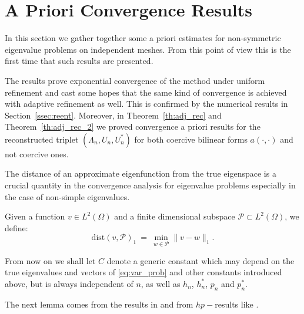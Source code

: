 \documentclass[smallextended]{svjour3}
\begin{document}
\section{A Priori Convergence Results}\label{sse:pcf_priori}\label{sec:aprio}



In this section  we gather together some a priori estimates for non-symmetric eigenvalue
problems on independent meshes. From this point of view this is the first time that such results are presented. 

The results prove exponential convergence of the method under uniform refinement and cast some hopes that the same kind of convergence is achieved with adaptive refinement as well. This is confirmed by the numerical results in Section~\ref{ssec:reent}. 
Moreover, in Theorem~\ref{th:adj_rec} and Theorem~\ref{th:adj_rec_2} we proved convergence a priori results for the reconstructed triplet $(\Lambda_n,U_n,U_n^*)$ for both coercive bilinear forms $a(\cdot,\cdot)$ and not coercive ones.



The distance of an approximate eigenfunction from the true eigenspace
is a crucial quantity in the convergence analysis for
eigenvalue problems  especially in the case of non-simple
eigenvalues.

\begin{definition}
\label{def:dist_h1}
Given a function $v\in L^2(\Omega)$ and a finite dimensional subspace $\mathcal{P}\subset L^2(\Omega)$, we define:
$$
\mathrm{dist}(v,\mathcal{P})_{1}\ =\ \min_{ w\in\mathcal{P}}  \|v-w\|_{1} .
$$

\end{definition}


From now on we shall let $C$ denote  a generic constant which 
may depend
on the 
true eigenvalues and vectors of \eqref{eq:var_prob} and other
constants introduced above, but is always independent of
$n$, as well as $h_n$, $h^*_n$, $p_n$ and $p^*_n$.  

The next lemma comes from the results in \cite{babuska}
and from $hp-$results like \cite[Theorem~4.72]{schwab}.
\end{document}
